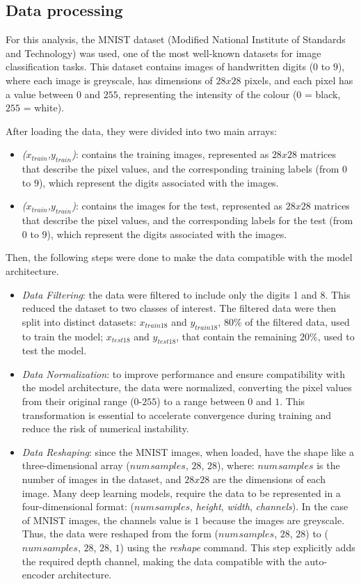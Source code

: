 \documentclass[9pt,technote]{IEEEtran}
\begin{document}
\subsection{Data processing}
For this analysis, the MNIST dataset (Modified National Institute of Standards and Technology) was used, one of the most well-known datasets for image classification tasks. This dataset contains images of handwritten digits ($0$ to $9$), where each image is greyscale, has dimensions of $28x28$ pixels, and each pixel has a value between $0$ and $255$, representing the intensity of the colour ($0$ = black, $255$ = white).

After loading the data, they were divided into two main arrays:
\begin{itemize}
	\item \textit{($x_{train}$,$y_{train}$)}: contains the training images, represented as $28x28$ matrices that describe the pixel values, and the corresponding training labels (from $0$ to $9$), which represent the digits associated with the images.
	\item \textit{($x_{train}$,$y_{train}$)}: contains the images for the test, represented as $28x28$ matrices that describe the pixel values, and the corresponding labels for the test (from $0$ to $9$), which represent the digits associated with the images.
\end{itemize}
Then, the following steps were done to make the data compatible with the model architecture.
\begin{itemize}
	\item \textit{Data Filtering}: the data were filtered to include only the digits 1 and 8. This reduced the dataset to two classes of interest. The filtered data were then split into distinct datasets: $x_{train18}$ and $y_{train18}$, $80\%$ of the filtered data, used to train the model; $x_{test18}$ and $y_{test18}$, that contain the remaining $20\%$, used to test the model. 
	\item \textit{Data Normalization}: to improve performance and ensure compatibility with the model architecture, the data were normalized, converting the pixel values from their original range ($0$-$255$) to a range between $0$ and $1$. This transformation is essential to accelerate convergence during training and reduce the risk of numerical instability.
	\item \textit{Data Reshaping}: since the MNIST images, when loaded, have the shape like a three-dimensional array (\textit{$num_{}samples$}, $28$, $28$), where: \textit{$num_{}samples$} is the number of images in the dataset, and $28x28$ are the dimensions of each image.
	Many deep learning models, require the data to be represented in a four-dimensional format: (\textit{$num_{}samples$}, \textit{height}, \textit{width}, \textit{channels}). In the case of MNIST images, the channels value is $1$ because the images are greyscale.
	Thus, the data were reshaped from the form (\textit{$num_{}samples$}, $28$, $28$) to (\textit{$num_{}samples$}, $28$, $28$, $1$) using the \textit{reshape} command. This step explicitly adds the required depth channel, making the data compatible with the auto-encoder architecture.
\end{itemize}
\end{document}

